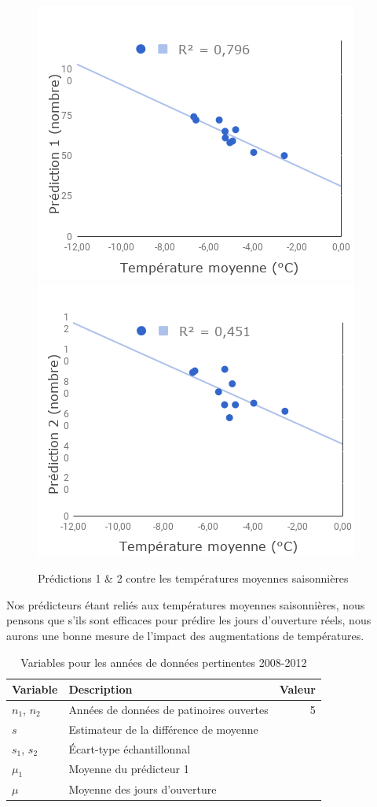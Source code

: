 \documentclass[12pt]{article}
\numberwithin{figure}{section}
\numberwithin{table}{section}
\begin{document}
\begin{figure}[h]
    \centering
    \includegraphics[scale=0.5]{Prediction1.png}
    \includegraphics[scale=0.5]{Prediction2.png}
    \caption{Pr\'edictions 1 \& 2 contre les temp\'eratures moyennes saisonni\`eres}\label{predictions}
\end{figure}

Nos pr\'edicteurs \'etant reli\'es aux temp\'eratures moyennes saisonni\`eres, nous pensons que
s'ils sont efficaces pour pr\'edire les jours d'ouverture r\'eels, nous aurons une bonne mesure
de l'impact des augmentations de temp\'eratures.

\begin{table}[h]
    \centering
    \begin{tabular}{|l|l|r|}\hline
        Variable &Description &Valeur\\\hline
        $n_1$, $n_2$ &Ann\'ees de donn\'ees de patinoires ouvertes &5\\\hline
        $s$ &Estimateur de la diff\'erence de moyenne &\\\hline
        $s_1$, $s_2$ &\'Ecart-type \'echantillonnal &\\\hline
        $\mu_1$ &Moyenne du pr\'edicteur 1 &\\\hline
        $\mu$ &Moyenne des jours d'ouverture &\\\hline
    \end{tabular}
    \caption{Variables pour les ann\'ees de donn\'ees pertinentes 2008-2012}\label{vars:predict}
\end{table}
\end{document}
